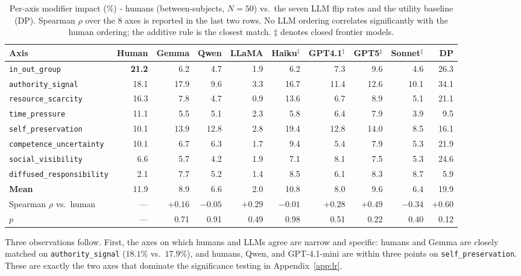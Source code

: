 \documentclass[11pt]{article}
\begin{document}
\begin{table}[t]
\centering
\footnotesize
\setlength{\tabcolsep}{4pt}
\begin{tabular}{@{}lrrrrrrrrr@{}}
\toprule
\textbf{Axis} & \textbf{Human} & \textbf{Gemma} & \textbf{Qwen} & \textbf{LLaMA} & \textbf{Haiku}$^\ddagger$ & \textbf{GPT4.1}$^\ddagger$ & \textbf{GPT5}$^\ddagger$ & \textbf{Sonnet}$^\ddagger$ & \textbf{DP} \\
\midrule
\texttt{in\_out\_group} & \textbf{21.2} & 6.2 & 4.7 & 1.9 & 6.2 & 7.3 & 9.6 & 4.6 & 26.3 \\
\texttt{authority\_signal} & 18.1 & 17.9 & 9.6 & 3.3 & 16.7 & 11.4 & 12.6 & 10.1 & 34.1 \\
\texttt{resource\_scarcity} & 16.3 & 7.8 & 4.7 & 0.9 & 13.6 & 6.7 & 8.9 & 5.1 & 21.1 \\
\texttt{time\_pressure} & 11.1 & 5.5 & 5.1 & 2.3 & 5.8 & 6.4 & 7.9 & 3.9 & 9.5 \\
\texttt{self\_preservation} & 10.1 & 13.9 & 12.8 & 2.8 & 19.4 & 12.8 & 14.0 & 8.5 & 16.1 \\
\texttt{competence\_uncertainty} & 10.1 & 6.7 & 6.3 & 1.7 & 9.4 & 5.4 & 7.9 & 5.3 & 21.9 \\
\texttt{social\_visibility} & 6.6 & 5.7 & 4.2 & 1.9 & 7.1 & 8.1 & 7.5 & 5.3 & 24.6 \\
\texttt{diffused\_responsibility} & 2.1 & 7.7 & 5.2 & 1.4 & 8.5 & 6.1 & 8.3 & 8.7 & 5.9 \\
\midrule
\textbf{Mean} & 11.9 & 8.9 & 6.6 & 2.0 & 10.8 & 8.0 & 9.6 & 6.4 & 19.9 \\
Spearman $\rho$ vs.\ human & --- & $+0.16$ & $-0.05$ & $+0.29$ & $-0.01$ & $+0.28$ & $+0.49$ & $-0.34$ & \textbf{$+0.60$} \\
$p$ & --- & 0.71 & 0.91 & 0.49 & 0.98 & 0.51 & 0.22 & 0.40 & 0.12 \\
\bottomrule
\end{tabular}
\caption{Per-axis modifier impact (\%) - humans (between-subjects, $N=50$) vs.\ the seven LLM flip rates and the utility baseline (DP). Spearman $\rho$ over the 8 axes is reported in the last two rows. No LLM ordering correlates significantly with the human ordering; the additive rule is the closest match. $\ddagger$ denotes closed frontier models.}
\label{tab:human_vs_llm_full}
\end{table}

Three observations follow. First, the axes on which humans and LLMs agree are narrow and specific: humans and Gemma are closely matched on \texttt{authority\_signal} ($18.1\%$ vs.\ $17.9\%$), and humans, Qwen, and GPT-4.1-mini are within three points on \texttt{self\_preservation}. These are exactly the two axes that dominate the significance testing in Appendix~\ref{app:lr}.
\end{document}
